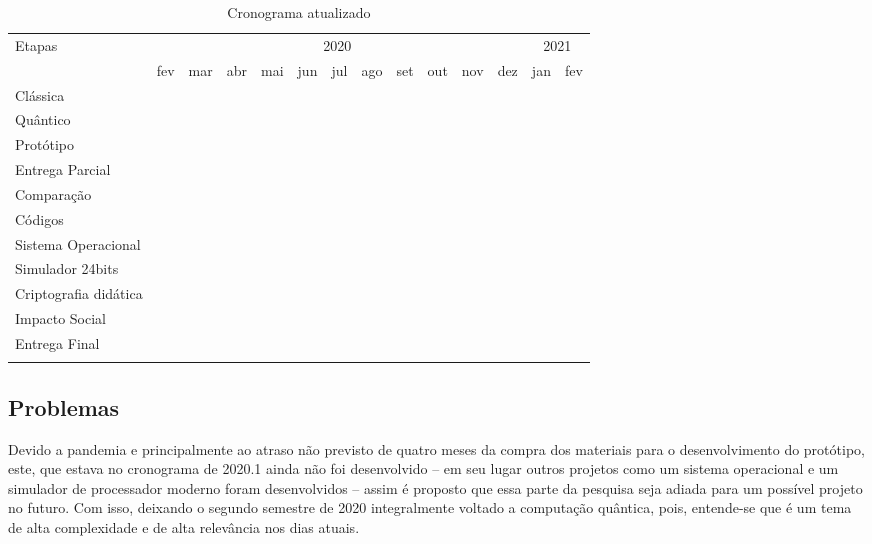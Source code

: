 \vspace{1cm}
\begin{longtable}{ |p{2.5cm}||p{0.60cm}|p{0.60cm}|p{0.60cm}|p{0.60cm}|p{0.60cm}|p{0.60cm}|p{0.60cm}|p{0.60cm}|p{0.60cm}|p{0.60cm}|p{0.60cm}|p{0.60cm}|p{0.60cm}|  }
  \hline
  \multirow{2}{*}{Etapas} & 
  \multicolumn{11}{|c|}{2020} & 
  \multicolumn{2}{|c|}{2021} \\
        &
    fev &
    mar &
    abr &
    mai &
    jun &
    jul &
    ago &
    set &
    out &
    nov &
    dez &
    jan &
    fev \\
  \hline
  Clássica & &
  \multicolumn{6}{|c|}{\cellcolor{green!25}} & 
  & & & & & \\
  \hline
  Quântico & &
  \multicolumn{1}{|c|}{\cellcolor{green!25}} & 
  & & & &
  \multicolumn{6}{|c|}{\cellcolor{blue!25}} & 
  \\
  \hline
  Protótipo & & & & &
  \multicolumn{1}{|c|}{\cellcolor{green!25}} & 
  & & & & & & & \\
  \hline
  Entrega Parcial & & & &
  \multicolumn{5}{|c|}{\cellcolor{green!25}} & 
  & & & & \\
  \hline
  Comparação & & & & & & & & & &
  \multicolumn{2}{|c|}{\cellcolor{blue!25}} & 
  & \\
  \hline
  Códigos & &
  \multicolumn{5}{|c|}{\cellcolor{green!25}} & 
  \multicolumn{6}{|c|}{\cellcolor{blue!25}} & 
  \\
  \hline
  Sistema Operacional & & &
  \multicolumn{5}{|c|}{\cellcolor{green!25}} & 
  & & & & & 
  \\
  \hline
  Simulador 24bits & & &
  \multicolumn{5}{|c|}{\cellcolor{green!25}} & 
  & & & & & 
  \\
  \hline
  Criptografia didática & & & & &
  \multicolumn{2}{|c|}{\cellcolor{green!25}} & 
  \multicolumn{3}{|c|}{\cellcolor{blue!25}} & 
  & & &
  \\
  \hline
  Impacto Social & & & & & &
  \multicolumn{2}{|c|}{\cellcolor{green!25}} & 
  & &
  \multicolumn{2}{|c|}{\cellcolor{blue!25}} & 
  & \\
  \hline
  Entrega Final & & & & & & &
  \multicolumn{7}{|c|}{\cellcolor{blue!25}} \\
  \hline
  \caption{Cronograma atualizado}
  \label{table:6}
\end{longtable}
\vspace{1cm}

\subsection{Problemas}
\label{problems}
Devido a pandemia e principalmente ao atraso não previsto de quatro meses da compra dos materiais para o desenvolvimento do protótipo, este, que estava no cronograma de 2020.1 ainda não foi desenvolvido – em seu lugar outros projetos como um sistema operacional e um simulador de processador moderno foram desenvolvidos – assim é proposto que essa parte da pesquisa seja adiada para um possível projeto no futuro. Com isso, deixando o segundo semestre de 2020 integralmente voltado a computação quântica, pois, entende-se que é um tema de alta complexidade e de alta relevância nos dias atuais.

\newpage